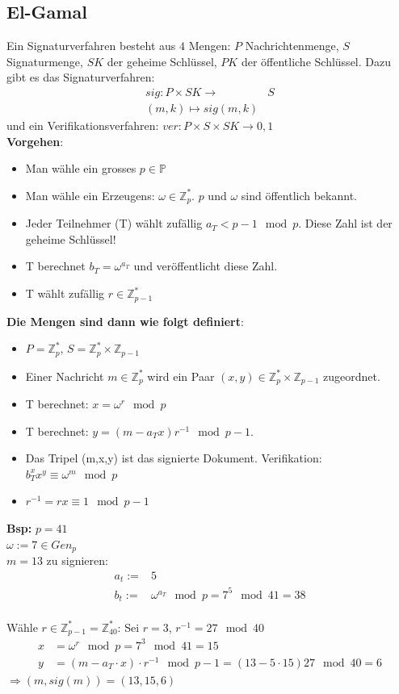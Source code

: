 \documentclass[landscape,twocolumn,a4paper]{article}
\newcommand{\ZN}{\mathbb{Z}} %
\newcommand{\Bold}[1]{\textbf{#1}} %
\newcommand{\Ra}{\Rightarrow}
\begin{document}
\subsection{El-Gamal}
Ein Signaturverfahren besteht aus $4$ Mengen: $P$ Nachrichtenmenge, $S$ Signaturmenge, $SK$ der geheime Schlüssel, $PK$ der öffentliche Schlüssel. Dazu gibt es das Signaturverfahren:
\begin{align*}
sig: P \times SK \rightarrow& S \\
(m,k) \mapsto sig(m, k)
\end{align*}
und ein Verifikationsverfahren: $ver: P \times S \times SK \rightarrow {0,1}$\\
\textbf{Vorgehen}:
\begin{itemize}
	\item Man wähle ein grosses $p \in \mathbb{P}$
	\item Man wähle ein Erzeugens: $\omega \in \mathbb{Z}_p^*$. $p$ und $\omega$ sind öffentlich bekannt.
	\item Jeder Teilnehmer (T) wählt zufällig $a_T < p-1 \mod p$. Diese Zahl ist der geheime Schlüssel!
	\item T berechnet $b_T = \omega^{a_T}$ und veröffentlicht diese Zahl.
	\item T wählt zufällig $r \in \mathbb{Z}_{p-1}^*$
\end{itemize}
\textbf{Die Mengen sind dann wie folgt definiert}:
\begin{itemize}
	\item $P = \mathbb{Z}_p^*$, $S = \mathbb{Z}_p^* \times \mathbb{Z}_{p-1}$ 
	\item Einer Nachricht $m \in \mathbb{Z}_p^*$ wird ein Paar $(x, y) \in \mathbb{Z}_p^* \times \mathbb{Z}_{p-1}$ zugeordnet. 
	\item T berechnet: $x = \omega ^r \mod p$ 
	\item T berechnet: $y = (m-a_T x)r^{-1} \mod p-1$. 
	\item Das Tripel (m,x,y) ist das signierte Dokument. Verifikation: $b_T^x x^y \equiv \omega ^m \mod p$
	\item $r^{-1} = rx \equiv 1 \mod p-1$
\end{itemize}
  \Bold{Bsp:} $p=41$\\
  $\omega:=7\in Gen_p$\\
  $m=13$ zu signieren:
  \begin{align*}
   a_t:=&5\\
   b_t:=&\omega^{a_T}\mod p=7^5\mod 41=38
  \end{align*}\\
  Wähle $r\in\ZN_{p-1}^*=\ZN_{40}^*$: Sei $r=3$, $r^{-1}=27\mod40$\\
  \begin{align*}
   x&=\omega^r\mod p=7^3\mod41=15\\
   y&=(m-a_T\cdot x)\cdot r^{-1}\mod p-1=(13-5\cdot 15)27\mod40=6
  \end{align*}
  $\Ra(m,sig(m))=(13,15,6)$
\end{document}
